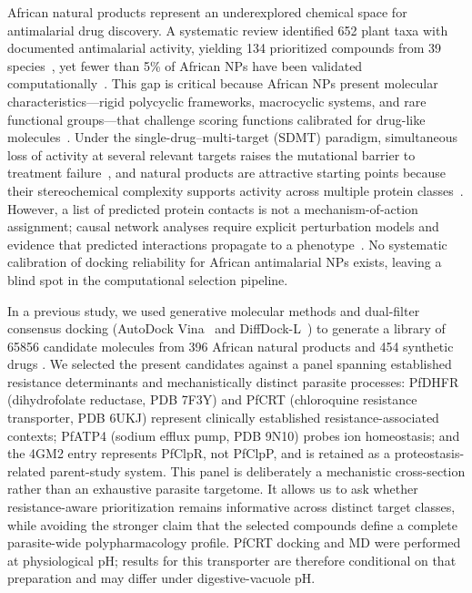 \documentclass[journal=jcisd8,manuscript=article,layout=traditional]{achemso}
\begin{document}
African natural products represent an underexplored chemical space for antimalarial drug discovery. A systematic review identified 652 plant taxa with documented antimalarial activity, yielding 134 prioritized compounds from 39 species~\citep{moyo2023prioritised}, yet fewer than 5\% of African NPs have been validated computationally~\citep{african_np_underexplored}. This gap is critical because African NPs present molecular characteristics---rigid polycyclic frameworks, macrocyclic systems, and rare functional groups---that challenge scoring functions calibrated for drug-like molecules~\citep{ramirez2018docking,ancajas2024np_sar}. Under the single-drug--multi-target (SDMT) paradigm, simultaneous loss of activity at several relevant targets raises the mutational barrier to treatment failure~\citep{sdmt2026trends,sdmt_trends_parasitology_2026}, and natural products are attractive starting points because their stereochemical complexity supports activity across multiple protein classes~\citep{polypharmacology_malaria_2026,value_addition_african_np_2025}. However, a list of predicted protein contacts is not a mechanism-of-action assignment; causal network analyses require explicit perturbation models and evidence that predicted interactions propagate to a phenotype~\citep{Trapotsi2022MoA}. No systematic calibration of docking reliability for African antimalarial NPs exists, leaving a blind spot in the computational selection pipeline.

In a previous study, we used generative molecular methods and dual-filter consensus docking (AutoDock Vina~\citep{vina_2021} and DiffDock-L~\citep{diffdock_2023}) to generate a library of \num{65856} candidate molecules from 396 African natural products and 454 synthetic drugs \citep{temgoua2026chemrxiv}. We selected the present candidates against a panel spanning established resistance determinants and mechanistically distinct parasite processes: PfDHFR (dihydrofolate reductase, PDB 7F3Y) and PfCRT (chloroquine resistance transporter, PDB 6UKJ) represent clinically established resistance-associated contexts; PfATP4 (sodium efflux pump, PDB 9N10) probes ion homeostasis; and the 4GM2 entry represents PfClpR, not PfClpP, and is retained as a proteostasis-related parent-study system. This panel is deliberately a mechanistic cross-section rather than an exhaustive parasite targetome. It allows us to ask whether resistance-aware prioritization remains informative across distinct target classes, while avoiding the stronger claim that the selected compounds define a complete parasite-wide polypharmacology profile. PfCRT docking and MD were performed at physiological pH; results for this transporter are therefore conditional on that preparation and may differ under digestive-vacuole pH.
\end{document}
